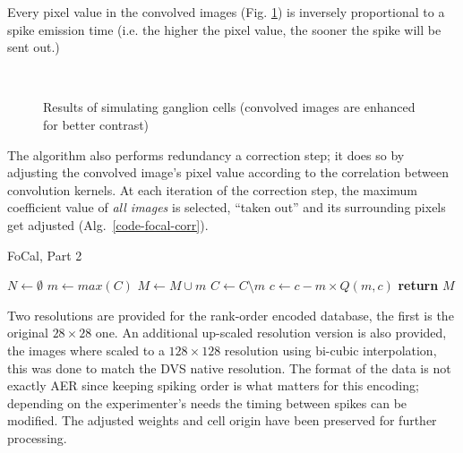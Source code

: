 Every pixel value in the convolved images (Fig. \ref{fig-convolution-results}) 
is inversely proportional to a spike emission time (i.e. the higher the pixel value, the sooner the spike will be sent out.)

\begin{figure}[hbt]
  \centering
  \\
  \caption{Results of simulating ganglion cells (convolved images are enhanced for better contrast)}
  \label{fig-convolution-results}
\end{figure}
The algorithm also performs redundancy a correction step; it does so by 
adjusting the convolved image's pixel value according to the correlation 
between convolution kernels. At each iteration of the correction step, the 
maximum coefficient value of \emph{all images} is selected, ``taken out'' and its surrounding pixels get adjusted (Alg.~\ref{code-focal-corr}).
\begin{algorithm}[h]
  \caption{FoCal, Part 2}
  \label{code-focal-corr}
  \begin{algorithmic}
    \State $N \leftarrow \emptyset$ 
    \Repeat
    \State $m \leftarrow max(C)$
    \State $M \leftarrow M \cup m$
    \State $C \leftarrow C \setminus m$
     
     
    \State $c \leftarrow c - m \times Q(m, c)$
    \EndIf
    \EndFor
    \State \textbf{return} $M$
    \EndProcedure
  \end{algorithmic}
\end{algorithm}
Two resolutions are provided for the rank-order encoded database, the first is 
the original $28\times28$ one. An additional up-scaled resolution version is also provided, the images where scaled to a $128\times128$ resolution using bi-cubic interpolation, this was done to match the DVS native resolution. The format of the data is not exactly AER since keeping spiking order is what matters for this encoding; depending
on the experimenter's needs the timing between spikes can be modified. The adjusted weights and cell origin have been preserved for further processing.
